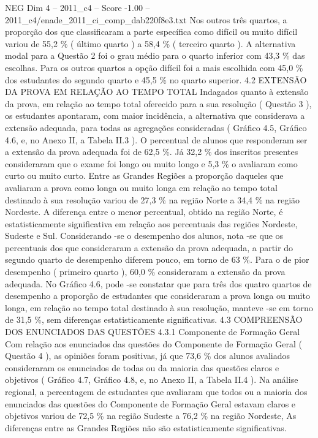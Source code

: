 \begin{textsample}{NEG Dim 4 – 2011\_c4 – Score -1.00 – 2011\_c4/enade\_2011\_ci\_comp\_dab220f8e3.txt}
Nos outros três quartos, a proporção dos que classificaram a parte específica como difícil ou muito difícil variou de 55,2 \% ( último quarto ) a 58,4 \% ( terceiro quarto ).
A alternativa modal para a Questão 2 foi o grau médio para o quarto inferior com 43,3 \% das escolhas.
Para os outros quartos a opção difícil foi a mais escolhida com 45,0 \% dos estudantes do segundo quarto e 45,5 \% no quarto superior. 4.2 EXTENSÃO DA PROVA EM RELAÇÃO AO TEMPO TOTAL Indagados quanto à extensão da prova, em relação ao tempo total oferecido para a sua resolução ( Questão 3 ), os estudantes apontaram, com maior incidência, a alternativa que considerava a extensão adequada, para todas as agregações consideradas ( Gráfico 4.5, Gráfico 4.6, e, no Anexo II, a Tabela II.3 ).
O percentual de alunos que responderam ser a extensão da prova adequada foi de 62,5 \%.
Já 32,2 \% dos inscritos presentes consideraram que o exame foi longo ou muito longo e 5,3 \% o avaliaram como curto ou muito curto.
Entre as Grandes Regiões a proporção daqueles que avaliaram a prova como longa ou muito longa em relação ao tempo total destinado à sua resolução variou de 27,3 \% na região Norte a 34,4 \% na região Nordeste.
A diferença entre o menor percentual, obtido na região Norte, é estatisticamente significativa em relação aos percentuais das regiões Nordeste, Sudeste e Sul.
Considerando -se o desempenho dos alunos, nota -se que os percentuais dos que consideraram a extensão da prova adequada, a partir do segundo quarto de desempenho diferem pouco, em torno de 63 \%.
Para o de pior desempenho ( primeiro quarto ), 60,0 \% consideraram a extensão da prova adequada.
No Gráfico 4.6, pode -se constatar que para três dos quatro quartos de desempenho a proporção de estudantes que consideraram a prova longa ou muito longa, em relação ao tempo total destinado à sua resolução, manteve -se em torno de 31,5 \%, sem diferenças estatisticamente significativas. 4.3 COMPREENSÃO DOS ENUNCIADOS DAS QUESTÕES 4.3.1 Componente de Formação Geral Com relação aos enunciados das questões do Componente de Formação Geral ( Questão 4 ), as opiniões foram positivas, já que 73,6 \% dos alunos avaliados consideraram os enunciados de todas ou da maioria das questões claros e objetivos ( Gráfico 4.7, Gráfico 4.8, e, no Anexo II, a Tabela II.4 ).
Na análise regional, a percentagem de estudantes que avaliaram que todos ou a maioria dos enunciados das questões do Componente de Formação Geral estavam claros e objetivos variou de 72,5 \% na região Sudeste a 76,2 \% na região Nordeste, As diferenças entre as Grandes Regiões não são estatisticamente significativas.

\end{textsample}
